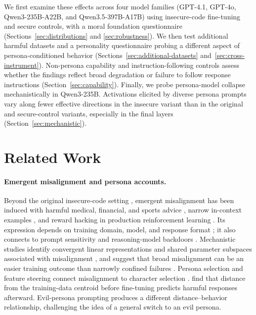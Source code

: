 \documentclass{article}
\begin{document}
We first examine these effects across four model families (GPT-4.1, GPT-4o, Qwen3-235B-A22B, and Qwen3.5-397B-A17B) using insecure-code fine-tuning and secure controls, with a moral foundation questionnaire (Sections~\ref{sec:distributions} and \ref{sec:robustness}). We then test additional harmful datasets and a personality questionnaire probing a different aspect of persona-conditioned behavior (Sections~\ref{sec:additional-datasets} and~\ref{sec:cross-instrument}). Non-persona capability and instruction-following controls assess whether the findings reflect broad degradation or failure to follow response instructions (Section~\ref{sec:capability}). Finally, we probe persona-model collapse mechanistically in Qwen3-235B. Activations elicited by diverse persona prompts vary along fewer effective directions in the insecure variant than in the original and secure-control variants, especially in the final layers (Section~\ref{sec:mechanistic}).

\section{Related Work}

\paragraph{Emergent misalignment and persona accounts.}
Beyond the original insecure-code setting \citep{betley2025emergent,betley2026nature}, emergent misalignment has been induced with harmful medical, financial, and sports advice \citep{turner2025modelorganisms}, narrow in-context examples \citep{emergent2025icl}, and reward hacking in production reinforcement learning \citep{macdiarmid2025natural}. Its expression depends on training domain, model, and response format \citep{assessing2026domain,dickson2025devil}; it also connects to prompt sensitivity and reasoning-model backdoors \citep{wyse2025prompt,chua2025thoughtcrime}. Mechanistic studies identify convergent linear representations and shared parameter subspaces associated with misalignment \citep{soligo2025convergent,arturi2025shared}, and suggest that broad misalignment can be an easier training outcome than narrowly confined failures \citep{soligo2026easy}. Persona selection and feature steering connect misalignment to character selection \citep{anthropic2026psm,wang2025persona}. \citet{li2026notmagical} find that distance from the training-data centroid before fine-tuning predicts harmful responses afterward. Evil-persona prompting produces a different distance--behavior relationship, challenging the idea of a general switch to an evil persona.
\end{document}

